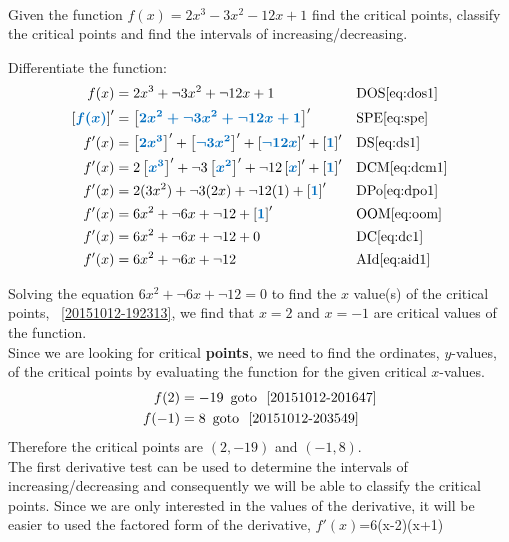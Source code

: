 \documentclass[20150903-160354-rs2.2-MarksMathNotebook.tex]{subfiles}
\begin{document}
\begin{example}[id:20151012-190708] \label{20151012-190708} \hfill \\

Given the function $f(x)=2x^3-3x^2-12x+1$ find the critical points, classify the critical points and find the intervals of increasing/decreasing. 
\soln

\solnsteps

Differentiate the function:
\begin{align*}
f(x) &= 2x^3+\neg 3x^2+\neg12x+1 && \text{DOS} \eqref{eq:dos1} \\
\farg{f(x)}' &= \farg{2x^2+\neg 3x^2 + \neg 12x+1}' && \text{SPE} \eqref{eq:spe} \\
f'(x) &= \farg{2x^3}' + \farg{\neg 3x^2}' + \farg{\neg 12x}' + \farg{1}' && \text{DS} \eqref{eq:ds1} \\
f'(x) &= 2\farg{x^3}' + \neg 3 \farg{x^2}' + \neg 12 \farg{x}' + \farg{1}' && \text{DCM} \eqref{eq:dcm1} \\
f'(x) &= 2(3x^2) + \neg 3 (2x) + \neg 12 (1) + \farg{1}' && \text{DPo} \eqref{eq:dpo1} \\
f'(x) &= 6x^2+\neg 6x + \neg 12 + \farg{1}' && \text{OOM} \eqref{eq:oom} \\
f'(x) &= 6x^2+\neg 6x + \neg 12 + 0 && \text{DC} \eqref{eq:dc1} \\
f'(x) &= 6x^2+\neg 6x + \neg 12 && \text{AId} \eqref{eq:aid1} 
\end{align*}

Solving the equation $6x^2 + \neg 6x + \neg 12=0$ to find the $x$ value(s) of the critical points,  \, \ref{20151012-192313}, we find that $x=2$ and $x=-1$ are critical values of the function.\\

Since we are looking for critical \textbf{points}, we need to find the ordinates, $y$-values, of the critical points by evaluating the function for the given critical $x$-values.
\begin{align*}
f(2) & = -19 \text{\, goto \,} \, \ref{20151012-201647}\\
f(-1) &= 8 \text{\, goto \,} \, \ref{20151012-203549}
\end{align*}
Therefore the critical points are $(2, -19)$ and $(-1, 8)$.\\

The first derivative test can be used to determine the intervals of increasing/decreasing and consequently we will be able to classify the critical points. Since we are only interested in the values of the derivative, it will be easier to used the factored form of the derivative, $f'(x)$=6(x-2)(x+1)\\



\end{example}
\end{document}
